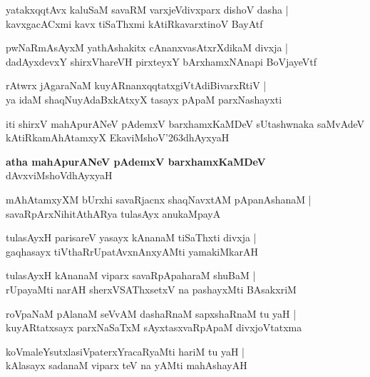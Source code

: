 \begin{shloka}
yatakxqqtAvx kaluSaM savaRM varxjeVdivxparx dishoV dasha |\\
kavxgacACxmi kavx tiSaThxmi kAtiRkavarxtinoV BayAtf
\end{shloka}

\begin{shloka}
pwNaRmAsAyxM yathAshakitx cAnanxvasAtxrXdikaM divxja |\\
dadAyxdevxY shirxVhareVH pirxteyxY bArxhamxNAnapi BoVjayeVtf
\end{shloka}

\begin{shloka}
rAtwrx jAgaraNaM kuyARnanxqqtatxgiVtAdiBivarxRtiV |\\
ya idaM shaqNuyAdaBxkAtxyX tasayx pApaM parxNashayxti
\end{shloka}
iti shirxV mahApurANeV pAdemxV barxhamxKaMDeV sUtashwnaka saMvAdeV kAtiRkamAhAtamxyX EkaviMshoV\char'263dhAyxyaH

\begin{center}
\textbf{\large atha mahApurANeV pAdemxV barxhamxKaMDeV}\\
dAvxviMshoVdhAyxyaH
\end{center}

\setcounter{shloka}{0}
\begin{shloka}
mAhAtamxyXM bUrxhi savaRjacnx shaqNavxtAM pApanAshanaM |\\
savaRpArxNihitAthARya tulasAyx anukaMpayA
\end{shloka}

\begin{shloka}
tulasAyxH parisareV yasayx kAnanaM tiSaThxti divxja |\\
gaqhasayx tiVthaRrUpatAvxnAnxyAMti yamakiMkarAH
\end{shloka}

\begin{shloka}
tulasAyxH kAnanaM viparx savaRpApaharaM shuBaM |\\
rUpayaMti narAH sherxVSAThxsetxV na pashayxMti BAsakxriM
\end{shloka}

\begin{shloka}
roVpaNaM pAlanaM seVvAM dashaRnaM sapxshaRnaM tu yaH |\\
kuyARtatxsayx parxNaSaTxM sAyxtasxvaRpApaM divxjoVtatxma
\end{shloka}

\begin{shloka}
koVmaleYsutxlasiVpaterxYracaRyaMti hariM tu yaH |\\
kAlasayx sadanaM viparx teV na yAMti mahAshayAH 
\end{shloka}


